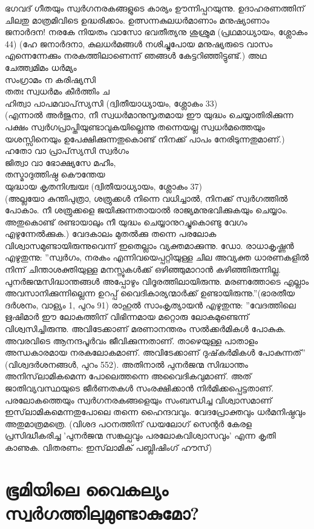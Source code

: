 ഭഗവദ് ഗീതയും സ്വര്‍ഗനരകങ്ങളുടെ കാര്യം ഊന്നിപ്പറയുന്നു. ഉദാഹരണത്തിന് ചിലതു മാത്രമിവിടെ ഉദ്ധരിക്കാം.
ഉത്സന്നകുലധര്‍മാണാം മനുഷ്യാണാം ജനാര്‍ദന!
നരകേ നിയതം വാസോ ഭവതീത്യനു ശുശ്രുമ (പ്രഥമാധ്യായം, ശ്ലോകം 44)
(ഹേ ജനാര്‍ദനാ, കുലധര്‍മങ്ങള്‍ നശിച്ചുപോയ മനുഷ്യരുടെ വാസം എന്നെന്നേക്കും നരകത്തിലാണെന്ന് ഞങ്ങള്‍ കേട്ടറിഞ്ഞിട്ടുണ്ട്.)
അഥ ചേത്ത്വമിമം ധര്‍മ്യം\\
സംഗ്രാമം ന കരിഷ്യസി\\
തതഃ സ്വധര്‍മം കീര്‍ത്തിം ച\\
ഹിത്വാ പാപമവാപ്‌സ്യസി (ദ്വിതീയാധ്യായം, ശ്ലോകം 33)\\
(എന്നാല്‍ അര്‍ജുനാ, നീ സ്വധര്‍മാനുസൃതമായ ഈ യുദ്ധം ചെയ്യാതിരിക്കുന്ന പക്ഷം സ്വര്‍ഗപ്രാപ്തിയുണ്ടാവുകയില്ലെന്നു തന്നെയല്ല സ്വധര്‍മത്തെയും യശസ്സിനെയും ഉപേക്ഷിക്കുന്നതുകൊണ്ട് നിനക്ക് പാപം നേരിടുന്നതുമാണ്.)\\
ഹതോ വാ പ്രാപ്‌സ്യസി സ്വര്‍ഗം\\
ജിത്വാ വാ ഭോക്ഷ്യസേ മഹീം,\\
തസ്മാദുത്തിഷ്ഠ കൌന്തേയ\\
യുദ്ധായ കൃതനിശ്ചയഃ (ദ്വിതീയാധ്യായം, ശ്ലോകം 37)\\
(അല്ലയോ കുന്തിപുത്രാ, ശത്രുക്കള്‍ നിന്നെ വധിച്ചാല്‍, നിനക്ക് സ്വര്‍ഗത്തില്‍ പോകാം. നീ ശത്രുക്കളെ ജയിക്കുന്നതായാല്‍ രാജ്യമനുഭവിക്കുകയും ചെയ്യാം. അതുകൊണ്ട് രണ്ടായാലും നീ യുദ്ധം ചെയ്യാനുറച്ചുകൊണ്ടു വേഗം എഴുന്നേല്‍ക്കുക.)
വേദകാലം മുതല്‍ക്കു തന്നെ പരലോക വിശ്വാസമുണ്ടായിരുന്നുവെന്ന് ഇതെല്ലാം വ്യക്തമാക്കുന്നു. ഡോ. രാധാകൃഷ്ണന്‍ എഴുതുന്നു: ''സ്വര്‍ഗം, നരകം എന്നിവയെപ്പറ്റിയുള്ള ചില അവ്യക്ത ധാരണകളില്‍ നിന്ന് ചിന്താശക്തിയുള്ള മനസ്സുകള്‍ക്ക് ഒഴിഞ്ഞുമാറാന്‍ കഴിഞ്ഞിരുന്നില്ല. പുനര്‍ജന്മസിദ്ധാന്തങ്ങള്‍ അപ്പോഴും വിദൂരത്തിലായിരുന്നു. മരണത്തോടെ എല്ലാം അവസാനിക്കുന്നില്ലെന്ന ഉറപ്പ് വൈദികാര്യന്മാര്‍ക്ക് ഉണ്ടായിരുന്നു.''(ഭാരതീയ ദര്‍ശനം, വാള്യം 1, പുറം 91)
രാഹുല്‍ സാംകൃത്യായന്‍ എഴുതുന്നു: ''വേദത്തിലെ ഋഷിമാര്‍ ഈ ലോകത്തിന് വിഭിന്നമായ മറ്റൊരു ലോകമുണ്ടെന്ന് വിശ്വസിച്ചിരുന്നു. അവിടേക്കാണ് മരണാനന്തരം സല്‍ക്കര്‍മികള്‍ പോകുക. അവരവിടെ ആനന്ദപൂര്‍വം ജീവിക്കുന്നതാണ്. താഴെയുള്ള പാതാളം അന്ധകാരമായ നരകലോകമാണ്. അവിടേക്കാണ് ദുഷ്‌കര്‍മികള്‍ പോകുന്നത്'' (വിശ്വദര്‍ശനങ്ങള്‍, പുറം 552).
അതിനാല്‍ പുനര്‍ജന്മ സിദ്ധാന്തം അനിസ്‌ലാമികമെന്ന പോലെത്തന്നെ അവൈദികവുമാണ്. അത് ജാതിവ്യവസ്ഥയുടെ ജീര്‍ണതകള്‍ സംരക്ഷിക്കാന്‍ നിര്‍മിക്കപ്പെട്ടതാണ്. പരലോകത്തെയും സ്വര്‍ഗനരകങ്ങളെയും സംബന്ധിച്ച വിശ്വാസമാണ് ഇസ്‌ലാമികമെന്നതുപോലെ തന്നെ ഹൈന്ദവവും. വേദപ്രോക്തവും ധര്‍മനിഷ്ഠവും അതുമാത്രമത്രെ.
(വിശദ പഠനത്തിന് ഡയലോഗ് സെന്റര്‍ കേരള പ്രസിദ്ധീകരിച്ച 'പുനര്‍ജന്മ സങ്കല്പവും പരലോകവിശ്വാസവും' എന്ന കൃതി കാണുക. വിതരണം: ഇസ്‌ലാമിക് പബ്ലിഷിംഗ് ഹൗസ്)
\chapter{ഭൂമിയിലെ വൈകല്യം സ്വര്‍ഗത്തിലുമുണ്ടാകുമോ? }

